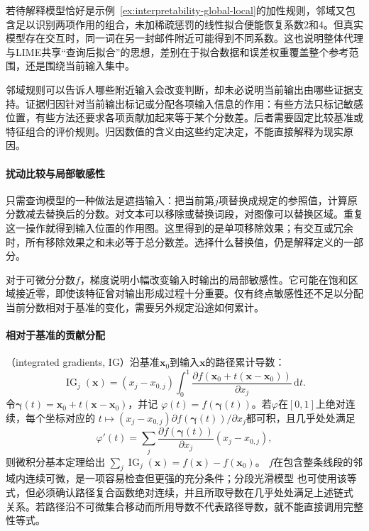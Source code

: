 若待解释模型恰好是示例~\ref{ex:interpretability-global-local}的加性规则，邻域又包含足以识别两项作用的组合，未加稀疏惩罚的线性拟合便能恢复系数2和4。但真实模型存在交互时，同一词在另一封邮件附近可能得到不同系数。这也说明整体代理与LIME共享“查询后拟合”的思想，差别在于拟合数据和误差权重覆盖整个参考范围，还是围绕当前输入集中。

邻域规则可以告诉人哪些附近输入会改变判断，却未必说明当前输出由哪些证据支持。证据归因针对当前输出标记或分配各项输入信息的作用：有些方法只标记敏感位置，有些方法还要求各项贡献加起来等于某个分数差。后者需要固定比较基准或特征组合的评价规则。归因数值的含义由这些约定决定，不能直接解释为现实原因。

\paragraph{扰动比较与局部敏感性}

只需查询模型的一种做法是遮挡输入：把当前第$j$项替换成规定的参照值，计算原分数减去替换后的分数。对文本可以移除或替换词段，对图像可以替换区域。重复这一操作就得到输入位置的作用图。这里得到的是单项移除效果；有交互或冗余时，所有移除效果之和未必等于总分数差。选择什么替换值，仍是解释定义的一部分。

对于可微分分数$f$，梯度说明小幅改变输入时输出的局部敏感性。它可能在饱和区域接近零，即使该特征曾对输出形成过程十分重要。仅有终点敏感性还不足以分配当前分数相对于基准的变化，需要另外规定沿途如何累计。

\paragraph{相对于基准的贡献分配}
\label{sec:interpretability-local-attribution}

（integrated gradients, IG）沿基准$\bm{x}_0$到输入$\bm{x}$的路径累计导数：
\begin{equation}
 \operatorname{IG}_j(\bm{x})
 =(x_j-x_{0,j})\int_0^1
 \frac{\partial f(\bm{x}_0+t(\bm{x}-\bm{x}_0))}
      {\partial x_j}\,\mathrm dt.
 \label{eq:interpretability-ig}
\end{equation}
令$\bm\gamma(t)=\bm{x}_0+t(\bm{x}-\bm{x}_0)$，并记
$\varphi(t)=f(\bm\gamma(t))$。若$\varphi$在$[0,1]$上绝对连续，每个坐标对应的
$t\mapsto(x_j-x_{0,j})\partial f(\bm\gamma(t))/\partial x_j$都可积，且几乎处处满足
\[
 \varphi'(t)=
 \sum_j\frac{\partial f(\bm\gamma(t))}{\partial x_j}(x_j-x_{0,j}),
\]
则微积分基本定理给出
$\sum_j\operatorname{IG}_j(\bm{x})=f(\bm{x})-f(\bm{x}_0)$。
$f$在包含整条线段的邻域内连续可微，是一项容易检查但更强的充分条件；分段光滑模型
也可使用该等式，但必须确认路径复合函数绝对连续，并且所取导数在几乎处处满足上述链式
关系。若路径沿不可微集合移动而所用导数不代表路径导数，就不能直接调用完整性等式。


